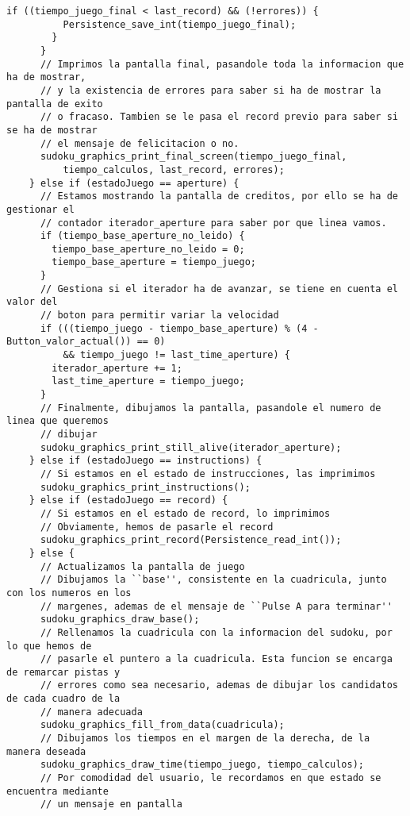\documentclass[12pt,letterpaper]{article}
\begin{document}
{\begin{lstlisting}[frame=single]
        if ((tiempo_juego_final < last_record) && (!errores)) {
          Persistence_save_int(tiempo_juego_final);
        }
      }
      // Imprimos la pantalla final, pasandole toda la informacion que ha de mostrar,
      // y la existencia de errores para saber si ha de mostrar la pantalla de exito 
      // o fracaso. Tambien se le pasa el record previo para saber si se ha de mostrar
      // el mensaje de felicitacion o no.
      sudoku_graphics_print_final_screen(tiempo_juego_final,
          tiempo_calculos, last_record, errores);
    } else if (estadoJuego == aperture) {
      // Estamos mostrando la pantalla de creditos, por ello se ha de gestionar el
      // contador iterador_aperture para saber por que linea vamos.
      if (tiempo_base_aperture_no_leido) {
        tiempo_base_aperture_no_leido = 0;
        tiempo_base_aperture = tiempo_juego;
      }
      // Gestiona si el iterador ha de avanzar, se tiene en cuenta el valor del
      // boton para permitir variar la velocidad
      if (((tiempo_juego - tiempo_base_aperture) % (4 - Button_valor_actual()) == 0)
          && tiempo_juego != last_time_aperture) {
        iterador_aperture += 1;
        last_time_aperture = tiempo_juego;
      }
      // Finalmente, dibujamos la pantalla, pasandole el numero de linea que queremos
      // dibujar
      sudoku_graphics_print_still_alive(iterador_aperture);
    } else if (estadoJuego == instructions) {
      // Si estamos en el estado de instrucciones, las imprimimos
      sudoku_graphics_print_instructions();
    } else if (estadoJuego == record) {
      // Si estamos en el estado de record, lo imprimimos
      // Obviamente, hemos de pasarle el record
      sudoku_graphics_print_record(Persistence_read_int());
    } else {
      // Actualizamos la pantalla de juego
      // Dibujamos la ``base'', consistente en la cuadricula, junto con los numeros en los 
      // margenes, ademas de el mensaje de ``Pulse A para terminar''
      sudoku_graphics_draw_base();
      // Rellenamos la cuadricula con la informacion del sudoku, por lo que hemos de 
      // pasarle el puntero a la cuadricula. Esta funcion se encarga de remarcar pistas y
      // errores como sea necesario, ademas de dibujar los candidatos de cada cuadro de la
      // manera adecuada
      sudoku_graphics_fill_from_data(cuadricula);
      // Dibujamos los tiempos en el margen de la derecha, de la manera deseada
      sudoku_graphics_draw_time(tiempo_juego, tiempo_calculos);
      // Por comodidad del usuario, le recordamos en que estado se encuentra mediante
      // un mensaje en pantalla

\end{lstlisting}}
\end{document}
